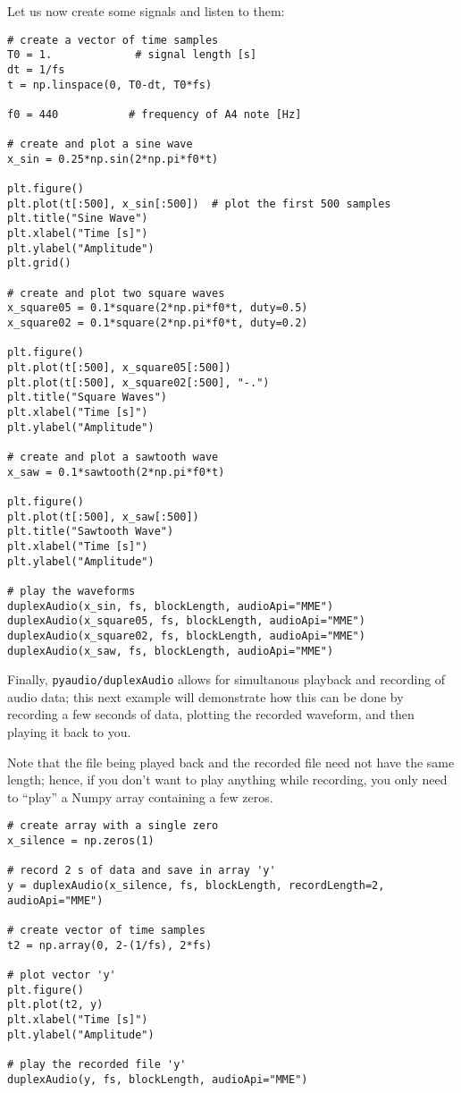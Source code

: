 Let us now create some signals and listen to them:
\begin{lstlisting}[frame=single]
# create a vector of time samples
T0 = 1.             # signal length [s]
dt = 1/fs
t = np.linspace(0, T0-dt, T0*fs)

f0 = 440           # frequency of A4 note [Hz]

# create and plot a sine wave
x_sin = 0.25*np.sin(2*np.pi*f0*t)

plt.figure()
plt.plot(t[:500], x_sin[:500])  # plot the first 500 samples
plt.title("Sine Wave")
plt.xlabel("Time [s]")
plt.ylabel("Amplitude")
plt.grid()

# create and plot two square waves
x_square05 = 0.1*square(2*np.pi*f0*t, duty=0.5)
x_square02 = 0.1*square(2*np.pi*f0*t, duty=0.2)

plt.figure()
plt.plot(t[:500], x_square05[:500])
plt.plot(t[:500], x_square02[:500], "-.")
plt.title("Square Waves")
plt.xlabel("Time [s]")
plt.ylabel("Amplitude")

# create and plot a sawtooth wave
x_saw = 0.1*sawtooth(2*np.pi*f0*t)

plt.figure()
plt.plot(t[:500], x_saw[:500])
plt.title("Sawtooth Wave")
plt.xlabel("Time [s]")
plt.ylabel("Amplitude")

# play the waveforms
duplexAudio(x_sin, fs, blockLength, audioApi="MME")
duplexAudio(x_square05, fs, blockLength, audioApi="MME")
duplexAudio(x_square02, fs, blockLength, audioApi="MME")
duplexAudio(x_saw, fs, blockLength, audioApi="MME")
\end{lstlisting}

Finally, {\tt pyaudio/duplexAudio} allows for simultanous playback and recording of audio data; this next example will demonstrate how this can be done by recording a few seconds of data, plotting the recorded waveform, and then playing it back to you.

Note that the file being played back and the recorded file need not have the same length; hence, if you don't want to play anything while recording, you only need to ``play'' a Numpy array containing a few zeros.

\begin{lstlisting}[frame=single]
# create array with a single zero
x_silence = np.zeros(1)

# record 2 s of data and save in array 'y'
y = duplexAudio(x_silence, fs, blockLength, recordLength=2, audioApi="MME")

# create vector of time samples
t2 = np.array(0, 2-(1/fs), 2*fs)

# plot vector 'y'
plt.figure()
plt.plot(t2, y)
plt.xlabel("Time [s]")
plt.ylabel("Amplitude")

# play the recorded file 'y'
duplexAudio(y, fs, blockLength, audioApi="MME")
\end{lstlisting}

